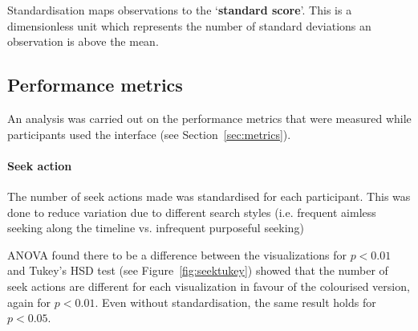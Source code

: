 Standardisation maps observations to the `\textbf{standard score}'. This is a dimensionless unit which represents the
number of standard deviations an observation is above the mean.

\subsection{Performance metrics}\label{sec:studymetrics}
An analysis was carried out on the performance metrics that were measured while participants used the interface (see
Section~\ref{sec:metrics}).

\paragraph{Seek action}
The number of seek actions made was standardised for each participant. This was done to reduce variation due to
different search styles (i.e. frequent aimless seeking along the timeline vs. infrequent purposeful seeking)

ANOVA found there to be a difference between the visualizations for $p < 0.01$ and Tukey's HSD test (see
Figure~\ref{fig:seektukey}) showed that the number of seek actions are different for each visualization in favour of
the colourised version, again for $p < 0.01$. Even without standardisation, the same result holds for $p < 0.05$.

